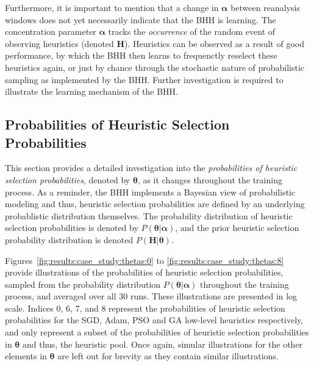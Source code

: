 Furthermore, it is important to mention that a change in $\boldsymbol{\alpha}$ between reanalysis windows does not yet necessarily indicate that the \acs{BHH} is learning. The concentration parameter $\boldsymbol{\alpha}$ tracks the \textit{occurrence} of the random event of observing heuristics (denoted $\boldsymbol{{H}}$). Heuristics can be observed as a result of good performance, by which the \acs{BHH} then learns to frequenctly reselect these heuristics again, or just by chance through the stochastic nature of probabilistic sampling as implemented by the \acs{BHH}. Further investigation is required to illustrate the learning mechanism of the \acs{BHH}.



\subsection{Probabilities of Heuristic Selection Probabilities}\label{sec:results:case_study:probs_of_select_probs}

This section provides a detailed investigation into the \textit{probabilities of heuristic selection probabilities}, denoted by $\boldsymbol{\theta}$, as it changes throughout the training process. As a reminder, the \acs{BHH} implements a Bayesian view of probabilistic modeling and thus, heuristic selection probabilities are defined by an underlying probablistic distribution themselves. The probability distribution of heuristic selection probabilities is denoted by $P(\boldsymbol{\theta} \vert \boldsymbol{\alpha})$, and the prior heuristic selection probability distribution is denoted $P(\boldsymbol{H} \vert \boldsymbol{\theta})$.

Figures~\ref{fig:results:case_study:thetas:0} to \ref{fig:results:case_study:thetas:8} provide illustrations of the probabilities of heuristic selection probabilities, sampled from the probability distribution $P(\boldsymbol{\theta} \vert \boldsymbol{\alpha})$ throughout the training process, and averaged over all 30 runs. These illustrations are presented in log scale. Indices 0, 6, 7, and 8 represent the probabilities of heuristic selection probabilities for the \acs{SGD}, \acs{Adam}, \acs{PSO} and \acs{GA} low-level heuristics respectively, and only represent a subset of the probabilities of heuristic selection probabilities in $\boldsymbol{\theta}$ and thus, the heuristic pool. Once again, simular illustrations for the other elements in $\boldsymbol{\theta}$ are left out for brevity as they contain similar illustrations.

